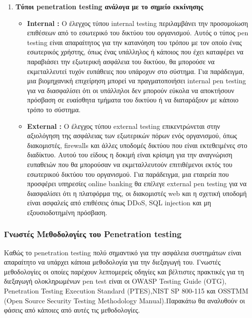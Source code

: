 {\begin{enumerate}
\begin{itemize}
    \end{itemize}
    \item{\textbf{ Τύποι \lt penetration testing \gt ανάλογα με το σημείο εκκίνησης}}
    \begin{itemize}
        \item \textbf{\lt Internal :} \gt Ο έλεγχος τύπου \lt internal  testing \gt περιλαμβάνει την προσομοίωση επιθέσεων από το εσωτερικό του δικτύου του οργανισμού. Αυτός ο τύπος \lt pen testing \gt είναι απαραίτητος για την κατανόηση του τρόπου με τον οποίο ένας εσωτερικός χρήστης, όπως ένας υπάλληλος ή κάποιος που έχει καταφέρει να παραβιάσει την εξωτερική ασφάλεια του δικτύου, θα μπορούσε να εκμεταλλευτεί τυχόν ευπάθειες που υπάροχυν στο σύστημα. Για παράδειγμα, μια βιομηχανική επιχείρηση μπορεί να πραγματοποιήσει \lt internal pen testing \gt για να διασφαλίσει ότι οι υπάλληλοι δεν μπορούν εύκολα να αποκτήσουν πρόσβαση σε ευαίσθητα τμήματα του δικτύου ή να διαταράξουν με κάποιο τρόπο το σύστημα.
        \item \textbf{\lt External :} \gt Ο έλεγχος τύπου \lt external  testing \gt  επικεντρώνεται στην αξιολόγηση της ασφάλειας των εξωτερικών πόρων ενός οργανισμού, όπως διακομιστές, \lt firewalls \gt και άλλες υποδομές δικτύου που είναι εκτεθειμένες στο διαδίκτυο. Αυτού του είδους η δοκιμή είναι κρίσιμη για την αναγνώριση ευπαθειών που θα μπορούσαν να εκμεταλλευτούν επιτιθέμενοι εκτός του εσωτερικού δικτύου του οργανισμού. Για παράδειγμα, μια  εταιρεία που προσφέρει υπηρεσίες \lt online banking \gt  θα επέλεγε  \lt external pen testing \gt  για να διασφαλίσει ότι η πλατφόρμα της, οι διακομιστές web και η σχετική υποδομή είναι ασφαλείς από επιθέσεις όπως \lt DDoS, SQL injection \gt και μη εξουσιοδοτημένη πρόσβαση.
    \end{itemize}
\end{enumerate}
}
\subsubsection{\gt Γνωστές Μεθοδολογίες του \lt Penetration testing}
\hspace*{2em}Καθώς το \lt penetration testing  πολύ σημαντικό για την ασφάλεια συστημάτων είναι απαραίτητο να υπάρχει κάποια μεθοδολογία για την διεξαγωγή του. Γνωστές μεθοδολογίες οι οποίες παρέχουν λεπτομερείς οδηγίες και βέλτιστες πρακτικές για τη διεξαγωγή ολοκληρωμένων \lt pen test \gt είναι οι \lt OWASP Testing Guide (OTG), Penetration Testing Execution Standard (PTES),NIST SP 800-115 και \lt OSSTMM (Open Source Security Testing Methodology Manual).Παρακάτω θα αναλυθούν οι φάσεις από κάποιες από αυτές τις μεθοδολογίες.

